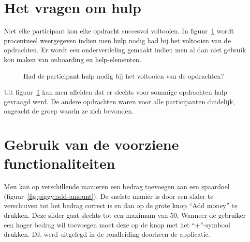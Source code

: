 \section{Het vragen om hulp}
\label{sec:vragen-hulp}

Niet elke participant kon elke opdracht succesvol voltooien. In figuur~\ref{fig:beschrijving-hulp} wordt procentueel weergegeven indien men hulp nodig had bij het voltooien van de opdrachten. Er wordt een onderverdeling gemaakt indien men al dan niet gebruik kon maken van onboarding en help-elementen.

\begin{figure}[h]
    \centering
    \qquad
    \qquad
    \qquad
    \qquad
    \qquad
    \caption{Had de participant hulp nodig bij het voltooien van de opdrachten?}
    \label{fig:beschrijving-hulp}
\end{figure}

Uit figuur~\ref{fig:beschrijving-hulp} kan men afleiden dat er slechts voor sommige opdrachten hulp gevraagd werd. De andere opdrachten waren voor alle participanten duidelijk, ongeacht de groep waarin ze zich bevonden.

\section{Gebruik van de voorziene functionaliteiten}
\label{sec:gebruik-functionaliteiten}

Men kan op verschillende manieren een bedrag toevoegen aan een spaardoel (figuur~\ref{fig:piggy:add-amount}). De snelste manier is door een slider te verschuiven tot het bedrag correct is en dan op de grote knop ``Add money'' te drukken. Deze slider gaat slechts tot een maximum van 50. Wanneer de gebruiker een hoger bedrag wil toevoegen moet deze op de knop met het ``+''-symbool drukken. Dit werd uitgelegd in de rondleiding doorheen de applicatie.

